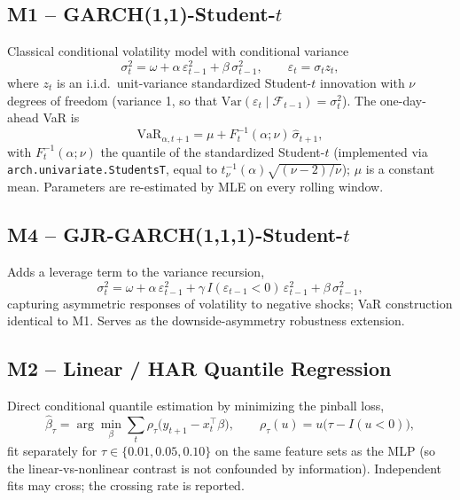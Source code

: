 \documentclass[11pt]{article}
\begin{document}
\subsection{M1 -- GARCH(1,1)-Student-$t$}
Classical conditional volatility model with conditional variance
\begin{equation}
\sigma_t^2 = \omega + \alpha\,\varepsilon_{t-1}^2 + \beta\,\sigma_{t-1}^2, \qquad \varepsilon_t = \sigma_t z_t,
\end{equation}
where $z_t$ is an i.i.d.\ unit-variance standardized Student-$t$ innovation with $\nu$ degrees of freedom (variance 1, so that $\mathrm{Var}(\varepsilon_t\mid\mathcal{F}_{t-1})=\sigma_t^2$). The one-day-ahead VaR is
\begin{equation}
\mathrm{VaR}_{\alpha,t+1} = \mu + F_t^{-1}(\alpha;\nu)\,\hat\sigma_{t+1},
\end{equation}
with $F_t^{-1}(\alpha;\nu)$ the quantile of the standardized Student-$t$ (implemented via \texttt{arch.univariate.\allowbreak StudentsT}, equal to $t_\nu^{-1}(\alpha)\sqrt{(\nu-2)/\nu}$); $\mu$ is a constant mean. Parameters are re-estimated by MLE on every rolling window.

\subsection{M4 -- GJR-GARCH(1,1,1)-Student-$t$}
Adds a leverage term to the variance recursion,
\begin{equation}
\sigma_t^2 = \omega + \alpha\,\varepsilon_{t-1}^2 + \gamma\,I(\varepsilon_{t-1}<0)\,\varepsilon_{t-1}^2 + \beta\,\sigma_{t-1}^2,
\end{equation}
capturing asymmetric responses of volatility to negative shocks; VaR construction identical to M1. Serves as the downside-asymmetry robustness extension.

\subsection{M2 -- Linear / HAR Quantile Regression}
Direct conditional quantile estimation by minimizing the pinball loss,
\begin{equation}
\hat{\beta}_\tau = \arg\min_\beta \sum_t \rho_\tau\big(y_{t+1} - x_t^\top\beta\big), \qquad \rho_\tau(u) = u\big(\tau - I(u<0)\big),
\end{equation}
fit separately for $\tau \in \{0.01, 0.05, 0.10\}$ on the same feature sets as the MLP (so the linear-vs-nonlinear contrast is not confounded by information). Independent fits may cross; the crossing rate is reported.
\end{document}
